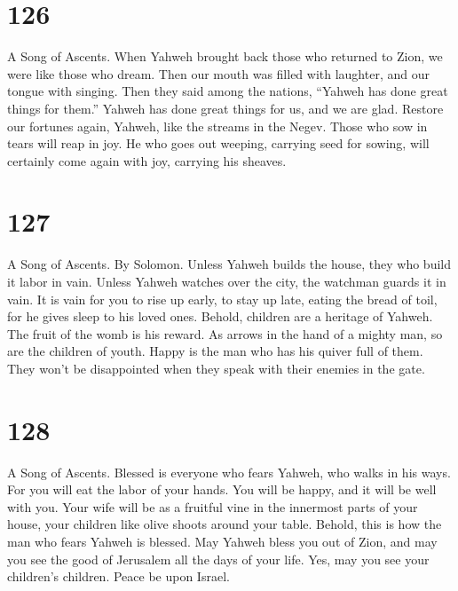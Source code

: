 \hypertarget{section-118}{%
\section{126}\label{section-118}}

A Song of Ascents.  When Yahweh brought back those who
returned to Zion, we were like those who dream.  Then our
mouth was filled with laughter, and our tongue with singing. Then they
said among the nations, ``Yahweh has done great things for them.''
 Yahweh has done great things for us, and we are glad.
 Restore our fortunes again, Yahweh, like the streams in
the Negev.  Those who sow in tears will reap in joy.
 He who goes out weeping, carrying seed for sowing, will
certainly come again with joy, carrying his sheaves.

\hypertarget{section-119}{%
\section{127}\label{section-119}}

A Song of Ascents. By Solomon.  Unless Yahweh builds the
house, they who build it labor in vain. Unless Yahweh watches over the
city, the watchman guards it in vain.  It is vain for you
to rise up early, to stay up late, eating the bread of toil, for he
gives sleep to his loved ones.  Behold, children are a
heritage of Yahweh. The fruit of the womb is his reward. 
As arrows in the hand of a mighty man, so are the children of youth.
 Happy is the man who has his quiver full of them. They
won't be disappointed when they speak with their enemies in the gate.

\hypertarget{section-120}{%
\section{128}\label{section-120}}

A Song of Ascents.  Blessed is everyone who fears Yahweh,
who walks in his ways.  For you will eat the labor of your
hands. You will be happy, and it will be well with you. 
Your wife will be as a fruitful vine in the innermost parts of your
house, your children like olive shoots around your table. 
Behold, this is how the man who fears Yahweh is blessed. 
May Yahweh bless you out of Zion, and may you see the good of Jerusalem
all the days of your life.  Yes, may you see your
children's children. Peace be upon Israel.

